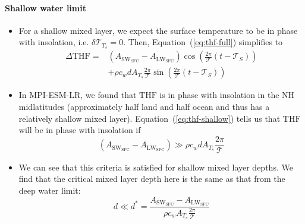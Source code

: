 \documentclass{ametsocV5}
\begin{document}
        \paragraph{Shallow water limit}
        \begin{itemize}
          \item For a shallow mixed layer, we expect the surface temperature to be in phase with insolation, i.e. $\delta\mathscr{T}_{T_{s}} = 0$. Then, Equation~(\ref{eq:thf-full}) simplifies to
                \begin{equation} \label{eq:thf-shallow}
                  \begin{aligned}
                    \Delta \mathrm{THF} =& \left( A_{\mathrm{SW_{SFC}}} - A_{\mathrm{LW_{SFC}}} \right) \cos\left(\frac{2\pi}{\mathcal{T}}(t-\mathscr{T}_{S})\right) \\
                    &+ \rho c_{w}d A_{T_{s}}\frac{2\pi}{\mathcal{T}} \sin\left(\frac{2\pi}{\mathcal{T}}(t-\mathscr{T}_{S})\right)
                  \end{aligned}
                \end{equation}
          \item In MPI-ESM-LR, we found that $\mathrm{THF}$ is in phase with insolation in the NH midlatitudes (approximately half land and half ocean and thus has a relatively shallow mixed layer). Equation~(\ref{eq:thf-shallow}) tells us that $\mathrm{THF}$ will be in phase with insolation if
                \begin{equation} \label{eq:in-phase}
                  \left(A_{\mathrm{SW_{SFC}}} - A_{\mathrm{LW_{SFC}}} \right) \gg \rho c_{w}d A_{T_{s}}\frac{2\pi}{\mathcal{T}}
                \end{equation}
          \item We can see that this criteria is satisfied for shallow mixed layer depths. We find that the critical mixed layer depth here is the same as that from the deep water limit:
                \begin{equation} \label{eq:d-shallow}
                  d \ll d^{*} = \frac{A_{\mathrm{SW_{SFC}}}-A_{\mathrm{LW_{SFC}}}}{\rho c_{w} A_{T_{s}}\frac{2\pi}{\mathcal{T}}}
                \end{equation}
        \end{itemize}
\end{document}

